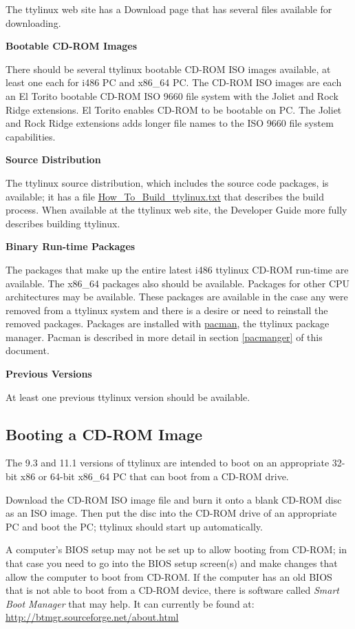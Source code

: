 \documentclass[10pt]{article}
\begin{document}
The ttylinux web site has a Download page that has several files available for
downloading.

{\bf Bootable CD-ROM Images}

There should be several ttylinux bootable CD-ROM ISO images available, at least
one each for i486 PC and x86\_64 PC. The CD-ROM ISO images are each an El Torito
bootable CD-ROM ISO 9660 file system with the Joliet and Rock Ridge extensions.
El Torito enables CD-ROM to be bootable on PC. The Joliet and Rock Ridge
extensions adds longer file names to the ISO 9660 file system capabilities.

{\bf Source Distribution}

The ttylinux source distribution, which includes the source code packages, is
available; it has a file \url{How_To_Build_ttylinux.txt} that describes the
build process. When available at the ttylinux web site, the Developer Guide
more fully describes building ttylinux.

{\bf Binary Run-time Packages}

The packages that make up the entire latest i486 ttylinux CD-ROM run-time are
available. The x86\_64 packages also should be available. Packages for other CPU
architectures may be available. These packages are available in the case any
were removed from a ttylinux system and there is a desire or need to reinstall
the removed packages. Packages are installed with \url{pacman}, the ttylinux
package manager. Pacman is described in more detail in section \ref{pacmanger}
of this document.

{\bf Previous Versions}

At least one previous ttylinux version should be available.

\subsection{Booting a CD-ROM Image}
\label{bootcd}

The 9.3 and 11.1 versions of ttylinux are intended to boot on an appropriate
32-bit x86 or 64-bit x86\_64 PC that can boot from a CD-ROM drive.

Download the CD-ROM ISO image file and burn it onto a blank CD-ROM disc as an
ISO image. Then put the disc into the CD-ROM drive of an appropriate PC and
boot the PC; ttylinux should start up automatically.

A computer's BIOS setup may not be set up to allow booting from CD-ROM; in that
case you need to go into the BIOS setup screen(s) and make changes that allow
the computer to boot from CD-ROM. If the computer has an old BIOS that is not
able to boot from a CD-ROM device, there is software called {\it Smart Boot
Manager} that may help. It can currently be found at:
\url{http://btmgr.sourceforge.net/about.html}
\end{document}
